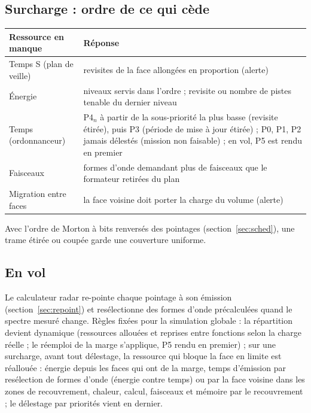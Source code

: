 \documentclass[11pt,a4paper]{article}
\begin{document}
\subsection{Surcharge : ordre de ce qui cède}
\begin{center}
{\small\begin{tabularx}{\linewidth}{@{}lL@{}}
\toprule
Ressource en manque & Réponse\\
\midrule
Temps S (plan de veille) & revisites de la face allongées en proportion (alerte)\\
Énergie & niveaux servis dans l'ordre ; revisite ou nombre de pistes tenable du dernier niveau\\
Temps (ordonnanceur) & P4$_n$ à partir de la sous-priorité la plus basse (revisite étirée), puis P3 (période de mise à
jour étirée) ; P0, P1, P2 jamais délestés (mission non faisable) ; en vol, P5 est rendu en premier\\
Faisceaux & formes d'onde demandant plus de faisceaux que le formateur retirées du plan\\
Migration entre faces & la face voisine doit porter la charge du volume (alerte)\\
\bottomrule
\end{tabularx}}
\end{center}
Avec l'ordre de Morton à bits renversés des pointages (section~\ref{sec:sched}), une trame étirée ou coupée garde une
couverture uniforme.

\subsection{En vol}
Le calculateur radar re-pointe chaque pointage à son émission (section~\ref{sec:repoint}) et resélectionne des formes
d'onde précalculées quand le spectre mesuré change. Règles fixées pour la simulation globale : la répartition devient
dynamique (ressources allouées et reprises entre fonctions selon la charge réelle ; le réemploi de la marge s'applique,
P5 rendu en premier) ; sur une surcharge, avant tout délestage, la ressource qui bloque la face en limite est
réallouée : énergie depuis les faces qui ont de la marge, temps d'émission par resélection de formes d'onde (énergie
contre temps) ou par la face voisine dans les zones de recouvrement, chaleur, calcul, faisceaux et mémoire par le
recouvrement ; le délestage par priorités vient en dernier.
\end{document}
